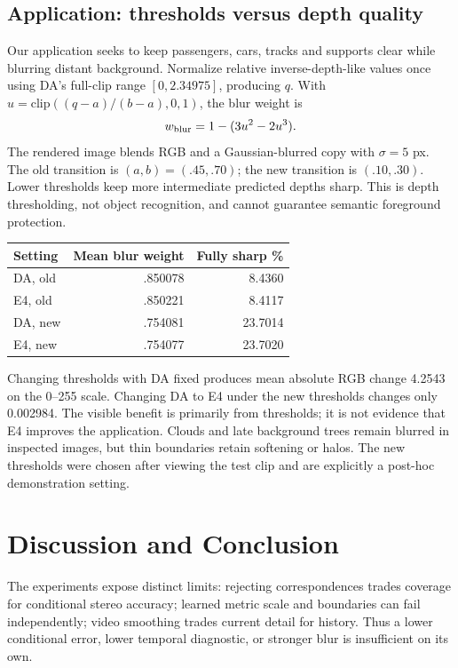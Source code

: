 \documentclass[10pt,twocolumn,letterpaper]{article}
\begin{document}
\subsection{Application: thresholds versus depth quality}
\label{sec:application}
Our application seeks to keep passengers, cars, tracks and supports clear while blurring distant background. Normalize relative inverse-depth-like values once using DA's full-clip range $[0,2.34975]$, producing $q$. With $u=\mathrm{clip}((q-a)/(b-a),0,1)$, the blur weight is
\begin{equation}
w_{\rm blur}=1-(3u^2-2u^3).
\end{equation}
The rendered image blends RGB and a Gaussian-blurred copy with $\sigma=5$ px. The old transition is $(a,b)=(.45,.70)$; the new transition is $(.10,.30)$. Lower thresholds keep more intermediate predicted depths sharp. This is depth thresholding, not object recognition, and cannot guarantee semantic foreground protection.

\begin{center}\begin{minipage}{\linewidth}\centering
{}
\small
\begin{tabular}{lrr}
\toprule
Setting &Mean blur weight &Fully sharp \%\\
\midrule
DA, old &.850078&8.4360\\
E4, old &.850221&8.4117\\
DA, new &.754081&23.7014\\
E4, new &.754077&23.7020\\
\bottomrule
\end{tabular}
\end{minipage}\end{center}

Changing thresholds with DA fixed produces mean absolute RGB change 4.2543 on the 0--255 scale. Changing DA to E4 under the new thresholds changes only 0.002984. The visible benefit is primarily from thresholds; it is not evidence that E4 improves the application. Clouds and late background trees remain blurred in inspected images, but thin boundaries retain softening or halos. The new thresholds were chosen after viewing the test clip and are explicitly a post-hoc demonstration setting.

\section{Discussion and Conclusion}
The experiments expose distinct limits: rejecting correspondences trades coverage for conditional stereo accuracy; learned metric scale and boundaries can fail independently; video smoothing trades current detail for history. Thus a lower conditional error, lower temporal diagnostic, or stronger blur is insufficient on its own.
\end{document}
